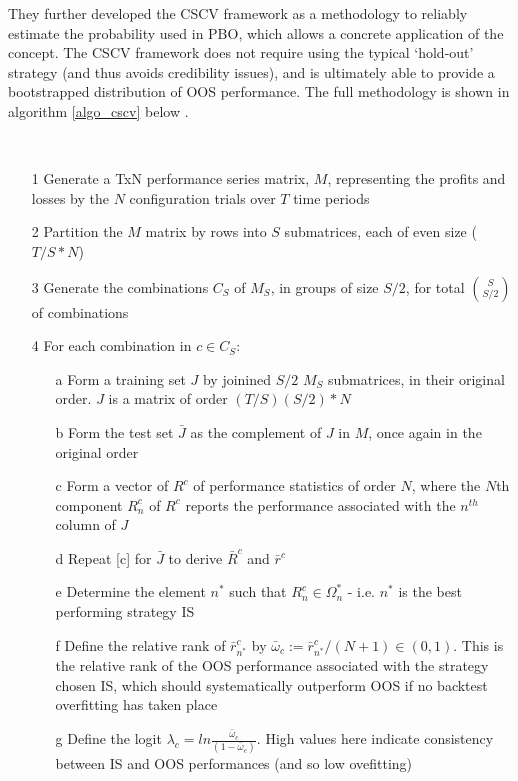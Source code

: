 \documentclass[a4paper,11pt,oneside]{article}
\theoremstyle{plain}
\theoremstyle{definition}
\begin{document}
	They further developed the CSCV framework as a methodology to reliably estimate the probability used in PBO, which allows a concrete application of the concept. The CSCV framework does not require using the typical ‘hold-out’ strategy (and thus avoids credibility issues), and is ultimately able to provide a bootstrapped distribution of OOS performance. The full methodology is shown in algorithm \ref{algo_cscv} below \cite{BailyPBO}.
	\hfill \break 
	
	\begin{algorithm}[H]
		\texttt{\\}
		
		\begin{itemize}
			\item[1]Generate a TxN performance series matrix, $M$, representing the profits and losses by the $N$ configuration trials over $T$ time periods
			\item[2]Partition the $M$ matrix by rows into $S$ submatrices, each of even size ($T/S * N$)
			\item[3]Generate the combinations $C_S$ of $M_S$, in groups of size $S/2$, for total $\binom{S}{S/2}$ of combinations
			\item[4]For each combination in $c \in C_S$:
			\begin{itemize}
				\item [a] Form a training set $J$ by joinined $S/2$ $M_S$ submatrices, in their original order. $J$ is a matrix of order $(T/S)(S/2)*N $
				\item [b] Form the test set $\bar{J}$ as the complement of $J$ in $M$, once again in the original order
				\item [c] Form a vector of $R^c$ of performance statistics of order $N$, where the $N$th component $R_n^c$ of $R^c$ reports the performance associated with the $n^{th}$ column of $J$
				\item [d] Repeat [c] for $\bar{J}$ to derive $\bar{R}^c$ and $\bar{r}^c$
				\item [e] Determine the element $n^*$ such that $R^c_n \in \Omega^*_n$ - i.e. $n^*$ is the best performing strategy IS
				\item [f] Define the relative rank of $\bar{r}^c_{n^*}$ by $\bar{\omega}_c := \bar{r}^c_{n^*} / (N +1) \in (0,1)$. This is the relative rank of the OOS performance associated with the strategy chosen IS, which should systematically outperform OOS if no backtest overfitting has taken place
				\item[g] Define the logit $\lambda_c = ln \frac{\bar{\omega}_c}{(1-\bar{\omega}_c)}$. High values here indicate consistency between IS and OOS performances (and so low ovefitting)

\end{itemize}
\end{itemize}
\end{algorithm}
\end{document}
